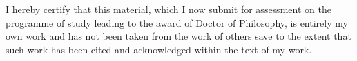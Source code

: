 
\begin{declaration}

I hereby certify that this material, which I now
submit for assessment on the programme of study leading to the award
of Doctor of Philosophy, is entirely my own work and has not been taken
from the work of others save to the extent that such work has been
cited and acknowledged within the text of my work.


\end{declaration}
